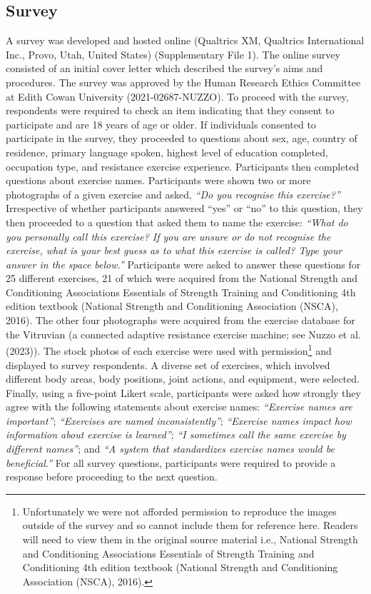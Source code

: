 \documentclass[
]{article}
\begin{document}
\subsection{Survey}\label{survey}

A survey was developed and hosted online (Qualtrics XM, Qualtrics
International Inc., Provo, Utah, United States) (Supplementary File 1).
The online survey consisted of an initial cover letter which described
the survey's aims and procedures. The survey was approved by the Human
Research Ethics Committee at Edith Cowan University (2021-02687-NUZZO).
To proceed with the survey, respondents were required to check an item
indicating that they consent to participate and are 18 years of age or
older. If individuals consented to participate in the survey, they
proceeded to questions about sex, age, country of residence, primary
language spoken, highest level of education completed, occupation type,
and resistance exercise experience. Participants then completed
questions about exercise names. Participants were shown two or more
photographs of a given exercise and asked, \emph{``Do you recognise this
exercise?''} Irrespective of whether participants answered ``yes'' or
``no'' to this question, they then proceeded to a question that asked
them to name the exercise: \emph{``What do you personally call this
exercise? If you are unsure or do not recognise the exercise, what is
your best guess as to what this exercise is called? Type your answer in
the space below.''} Participants were asked to answer these questions
for 25 different exercises, 21 of which were acquired from the National
Strength and Conditioning Associations Essentials of Strength Training
and Conditioning 4th edition textbook (National Strength and
Conditioning Association (NSCA), 2016). The other four photographs were
acquired from the exercise database for the Vitruvian (a connected
adaptive resistance exercise machine; see Nuzzo et al. (2023)). The
stock photos of each exercise were used with permission\footnote{Unfortunately
  we were not afforded permission to reproduce the images outside of the
  survey and so cannot include them for reference here. Readers will
  need to view them in the original source material i.e., National
  Strength and Conditioning Associations Essentials of Strength Training
  and Conditioning 4th edition textbook (National Strength and
  Conditioning Association (NSCA), 2016).} and displayed to survey
respondents. A diverse set of exercises, which involved different body
areas, body positions, joint actions, and equipment, were selected.
Finally, using a five-point Likert scale, participants were asked how
strongly they agree with the following statements about exercise names:
\emph{``Exercise names are important''}; \emph{``Exercises are named
inconsistently''}; \emph{``Exercise names impact how information about
exercise is learned''}; \emph{``I sometimes call the same exercise by
different names''}; and \emph{``A system that standardizes exercise
names would be beneficial.''} For all survey questions, participants
were required to provide a response before proceeding to the next
question.
\end{document}
